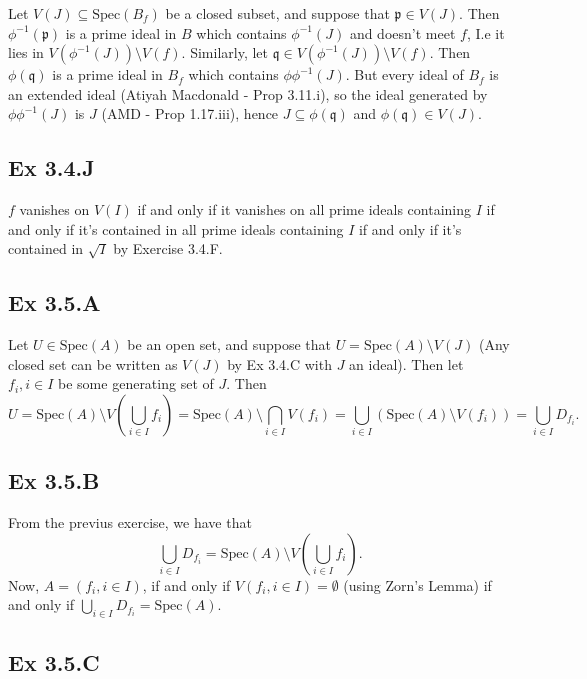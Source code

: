 \documentclass{article}
\theoremstyle{definition}
\newcommand{\Spec}{\text{Spec}}
\begin{document}
Let $V(J) \subseteq \Spec(B_f)$ be a closed subset, and suppose that
$\mathfrak{p} \in V(J)$. Then $\phi^{-1}(\mathfrak{p})$ is a prime ideal in $B$
which contains $\phi^{-1}(J)$ and doesn't meet $f$, I.e it lies in
$V(\phi^{-1}(J)) \setminus V(f)$. Similarly, let $\mathfrak{q} \in
	V(\phi^{-1}(J)) \setminus V(f)$. Then $\phi(\mathfrak{q})$ is a prime ideal in
$B_f$ which contains $\phi\phi^{-1}(J)$. But every ideal of $B_f$ is an
extended ideal (Atiyah Macdonald - Prop 3.11.i), so the ideal generated by
$\phi\phi^{-1}(J)$ is $J$ (AMD - Prop 1.17.iii), hence $J \subseteq
	\phi(\mathfrak{q})$ and $\phi(\mathfrak{q}) \in V(J)$.

\subsection*{Ex 3.4.J}

$f$ vanishes on $V(I)$ if and only if it vanishes on all prime ideals
containing $I$ if and only if it's contained in all prime ideals containing $I$
if and only if it's contained in $\sqrt{I}$ by Exercise 3.4.F.

\subsection*{Ex 3.5.A}

Let $U \in \Spec(A)$ be an open set, and suppose that $U = \Spec(A) \setminus
	V(J)$ (Any closed set can be written as $V(J)$ by Ex 3.4.C with $J$ an ideal).
Then let $f_i, i \in I$ be some generating set of $J$. Then
\[
	U
	=
	\Spec(A) \setminus V\left( \bigcup_{i \in I} f_i \right)
	=
	\Spec(A) \setminus \bigcap_{i \in I} V\left(f_i\right)
	=
	\bigcup_{i \in I} \left(\Spec(A) \setminus V\left(f_i\right)\right)
	=
	\bigcup_{i \in I} D_{f_i}.
\]

\subsection*{Ex 3.5.B}

From the previus exercise, we have that
\[
	\bigcup_{i \in I} D_{f_i}
	=
	\Spec(A) \setminus V\left(\bigcup_{i \in I} f_i\right).
\]
Now, $A = (f_i, i \in I)$, if and only if $V(f_i, i \in I) = \emptyset$ (using
Zorn's Lemma) if and only if $\bigcup_{i \in I} D_{f_i} = \Spec(A)$.

\subsection*{Ex 3.5.C}
\end{document}

